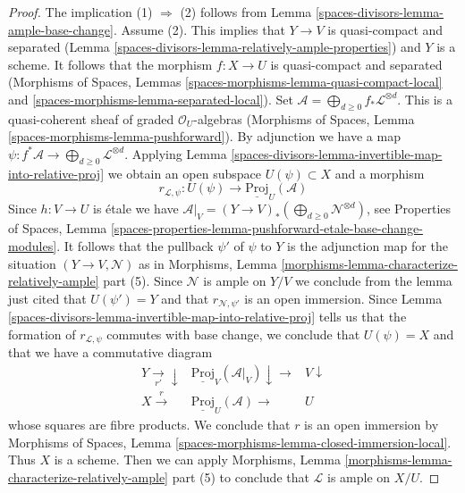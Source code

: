 \begin{proof}
The implication (1) $\Rightarrow$ (2) follows from
Lemma \ref{spaces-divisors-lemma-ample-base-change}.
Assume (2). This implies that $Y \to V$ is
quasi-compact and separated (Lemma \ref{spaces-divisors-lemma-relatively-ample-properties})
and $Y$ is a scheme. It follows that the morphism $f : X \to U$ is
quasi-compact and separated
(Morphisms of Spaces, Lemmas
\ref{spaces-morphisms-lemma-quasi-compact-local} and
\ref{spaces-morphisms-lemma-separated-local}).
Set $\mathcal{A} = \bigoplus_{d \geq 0} f_*\mathcal{L}^{\otimes d}$.
This is a quasi-coherent sheaf of graded $\mathcal{O}_U$-algebras
(Morphisms of Spaces, Lemma \ref{spaces-morphisms-lemma-pushforward}).
By adjunction we have a map
$\psi : f^*\mathcal{A} \to \bigoplus_{d \geq 0} \mathcal{L}^{\otimes d}$.
Applying Lemma \ref{spaces-divisors-lemma-invertible-map-into-relative-proj}
we obtain an open subspace $U(\psi) \subset X$ and a morphism
$$
r_{\mathcal{L}, \psi} : U(\psi) \to \underline{\text{Proj}}_U(\mathcal{A})
$$
Since $h : V \to U$ is \'etale we have
$\mathcal{A}|_V = (Y \to V)_*(\bigoplus_{d \geq 0} \mathcal{N}^{\otimes d})$,
see Properties of Spaces, Lemma
\ref{spaces-properties-lemma-pushforward-etale-base-change-modules}.
It follows that the pullback $\psi'$ of $\psi$ to
$Y$ is the adjunction map for the situation $(Y \to V, \mathcal{N})$ as in
Morphisms, Lemma \ref{morphisms-lemma-characterize-relatively-ample} part (5).
Since $\mathcal{N}$ is ample on $Y/V$ we conclude from the lemma just
cited that $U(\psi') = Y$ and that $r_{\mathcal{N}, \psi'}$
is an open immersion.
Since Lemma \ref{spaces-divisors-lemma-invertible-map-into-relative-proj}
tells us that the formation of $r_{\mathcal{L}, \psi}$
commutes with base change, we conclude that
$U(\psi) = X$ and that we have a commutative diagram
$$
\begin{array}{ccc}Y \underset{r'}{\longrightarrow}\downarrow & \underline{\text{Proj}}_V(\mathcal{A}|_V) \downarrow\longrightarrow & V \downarrow \\ X \overset{r}{\longrightarrow} & \underline{\text{Proj}}_U(\mathcal{A}) \longrightarrow & U\end{array}
$$
whose squares are fibre products. We conclude that $r$ is an
open immersion by
Morphisms of Spaces, Lemma \ref{spaces-morphisms-lemma-closed-immersion-local}.
Thus $X$ is a scheme. Then we can apply
Morphisms, Lemma \ref{morphisms-lemma-characterize-relatively-ample} part (5)
to conclude that $\mathcal{L}$ is ample on $X/U$.
\end{proof}

